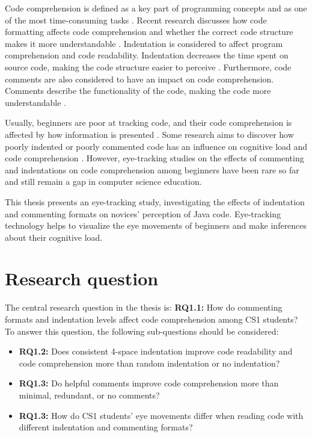Code comprehension is defined as a key part of programming concepts and as one of the most time-consuming tasks \cite{javier2021understanding}.
Recent research discusses how code formatting affects code comprehension and whether the correct code structure makes it more understandable \cite{andrzejewska2020development}. Indentation is considered to affect program comprehension and code readability. Indentation decreases the time spent on source code, making the code structure easier to perceive \cite{bauer2017indentations}. Furthermore, code comments are also considered to have an impact on code comprehension. Comments describe the functionality of the code, making the code more understandable \cite{bakhuizen2019comments}.
 
Usually, beginners are poor at tracking code, and their code comprehension is affected by how information is presented \cite{robins2003learning}. Some research aims to discover how poorly indented or poorly commented code has an influence on cognitive load and code comprehension \cite{bauer2017indentations} \cite{yorimoto2024quantitative}.  However, eye-tracking studies on the effects of commenting and indentations on code comprehension among beginners have been rare so far and still remain a gap in computer science education.

  
This thesis presents an eye-tracking study, investigating the effects of indentation and commenting formats on novices’ perception of Java code. Eye-tracking technology helps to visualize the eye movements of beginners and make inferences about their cognitive load. 


\section{Research question}

The central research question in the thesis is: \textbf{RQ1.1:} How do commenting formats and indentation levels affect code comprehension among CS1 students? To answer this question, the following sub-questions should be considered:

\begin{itemize}
    \item \textbf{RQ1.2:} Does consistent 4-space indentation improve code readability and code comprehension more than random indentation or no indentation? 
    \item \textbf{RQ1.3:} Do helpful comments improve code comprehension more than minimal, redundant, or no comments?
    \item \textbf{RQ1.3:} How do CS1 students’ eye movements differ when reading code with different indentation and commenting formats?

\end{itemize}

